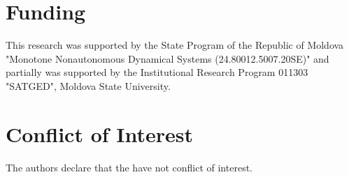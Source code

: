 \documentclass{amsart}%
\begin{document}
\section{Funding}

This research was supported by the State Program of the Republic
of Moldova "Monotone Nonautonomous Dynamical Systems
(24.80012.5007.20SE)" and partially was supported by the
Institutional Research Program 011303 "SATGED", Moldova State
University.

\section{Conflict of Interest}

The authors declare that the have not conflict of interest.
\end{document}
